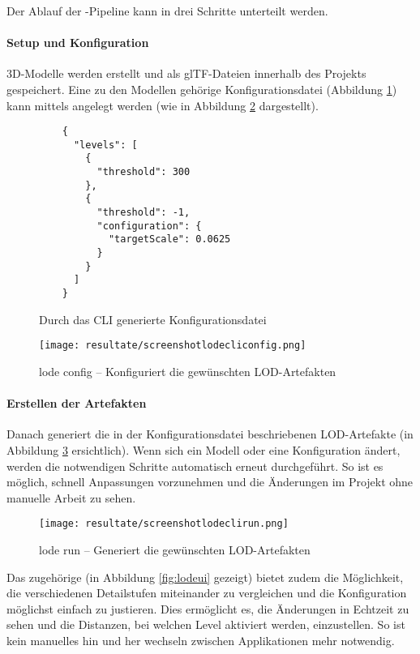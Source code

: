 Der Ablauf der -Pipeline kann in drei Schritte unterteilt werden.

\paragraph{Setup und Konfiguration}
3D-Modelle werden erstellt und als glTF-Dateien innerhalb des Projekts gespeichert. Eine zu den Modellen gehörige Konfigurationsdatei (Abbildung \ref{fig:lodeConfigFile}) kann mittels  angelegt werden (wie in Abbildung \ref{fig:lodecliconfig} dargestellt).

\begin{figure}[H]
  \begin{lstlisting}
    {
      "levels": [
        {
          "threshold": 300
        },
        {
          "threshold": -1,
          "configuration": {
            "targetScale": 0.0625
          }
        }
      ]
    }
  \end{lstlisting}
\caption{Durch das CLI generierte Konfigurationsdatei}
\label{fig:lodeConfigFile}
\end{figure}

\begin{figure}[H]
  \centering
  \texttt{[image: resultate/screenshotlodecliconfig.png]}
  \caption{lode  config – Konfiguriert die gewünschten LOD-Artefakten}
  \label{fig:lodecliconfig}
\end{figure}

\paragraph{Erstellen der Artefakten}
Danach generiert  die in der Konfigurationsdatei beschriebenen LOD-Artefakte (in Abbildung \ref{fig:lodeclirun} ersichtlich). Wenn sich ein Modell oder eine Konfiguration ändert, werden die notwendigen Schritte automatisch erneut durchgeführt. So ist es möglich, schnell Anpassungen vorzunehmen und die Änderungen im Projekt ohne manuelle Arbeit zu sehen.

\begin{figure}[H]
  \centering
  \texttt{[image: resultate/screenshotlodeclirun.png]}
  \caption{lode  run – Generiert die gewünschten LOD-Artefakten}
  \label{fig:lodeclirun}
\end{figure}

Das zugehörige  (in Abbildung \ref{fig:lodeui} gezeigt) bietet zudem die Möglichkeit, die verschiedenen Detailstufen miteinander zu vergleichen und die Konfiguration möglichst einfach zu justieren. Dies ermöglicht es, die Änderungen in Echtzeit zu sehen und die Distanzen, bei welchen Level aktiviert werden, einzustellen. So ist kein manuelles hin und her wechseln zwischen Applikationen mehr notwendig.

